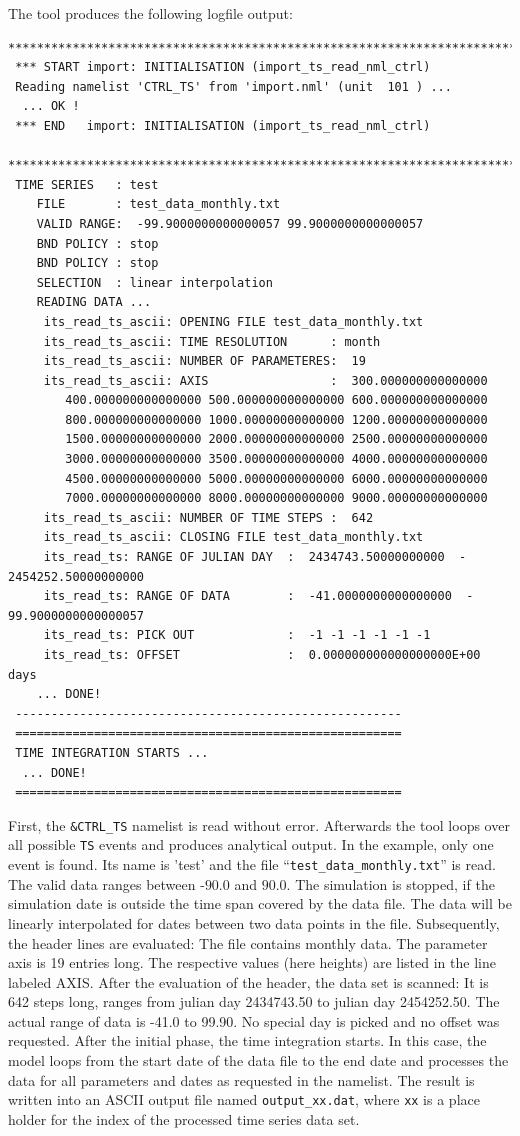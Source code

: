 \documentclass[11pt,twoside]{report}
\begin{document}
The tool produces the following logfile output:
\begin{verbatim}
**************************************************************************
 *** START import: INITIALISATION (import_ts_read_nml_ctrl)
 Reading namelist 'CTRL_TS' from 'import.nml' (unit  101 ) ...
  ... OK !
 *** END   import: INITIALISATION (import_ts_read_nml_ctrl)
 **************************************************************************
 TIME SERIES   : test
    FILE       : test_data_monthly.txt
    VALID RANGE:  -99.9000000000000057 99.9000000000000057
    BND POLICY : stop
    BND POLICY : stop
    SELECTION  : linear interpolation
    READING DATA ...
     its_read_ts_ascii: OPENING FILE test_data_monthly.txt
     its_read_ts_ascii: TIME RESOLUTION      : month 
     its_read_ts_ascii: NUMBER OF PARAMETERES:  19
     its_read_ts_ascii: AXIS                 :  300.000000000000000 
        400.000000000000000 500.000000000000000 600.000000000000000
        800.000000000000000 1000.00000000000000 1200.00000000000000
        1500.00000000000000 2000.00000000000000 2500.00000000000000 
        3000.00000000000000 3500.00000000000000 4000.00000000000000 
        4500.00000000000000 5000.00000000000000 6000.00000000000000 
        7000.00000000000000 8000.00000000000000 9000.00000000000000
     its_read_ts_ascii: NUMBER OF TIME STEPS :  642
     its_read_ts_ascii: CLOSING FILE test_data_monthly.txt
     its_read_ts: RANGE OF JULIAN DAY  :  2434743.50000000000  -  2454252.50000000000
     its_read_ts: RANGE OF DATA        :  -41.0000000000000000  -  99.9000000000000057
     its_read_ts: PICK OUT             :  -1 -1 -1 -1 -1 -1
     its_read_ts: OFFSET               :  0.000000000000000000E+00  days
    ... DONE!
 ------------------------------------------------------
 ======================================================
 TIME INTEGRATION STARTS ...
  ... DONE!
 ======================================================
\end{verbatim}
First, the \verb|&CTRL_TS| namelist is read without error. Afterwards the
tool loops over all possible \verb|TS| events and produces
analytical output. 
In the example, only one event is found. Its name is 'test' and the file
``\verb|test_data_monthly.txt|'' is read. The valid data ranges between
-$90.0$ and $90.0$. The simulation is stopped, if the simulation date is outside
the time span covered by the data file. The data will be linearly
interpolated 
for dates between two data points in the file.
Subsequently, the header lines are evaluated: The file contains monthly data.
 The parameter axis is 19 entries long. The respective values (here
 heights) are listed in the line labeled AXIS. 
After the evaluation of the header, the data set is scanned:
It is 642 steps long, ranges from julian day  2434743.50 to julian day 
 2454252.50. The actual range of data is -41.0 to 99.90. No special day is
picked and no offset was requested.
After the initial phase, the time integration starts. In this case,
the model loops from the start date of the data file to the end date and
processes the data for all parameters and dates as requested in the namelist.
 The result is written
into an ASCII output file named \verb|output_xx.dat|, where \verb|xx| is a
place holder for the index of the processed time series data set. 
\end{document}
